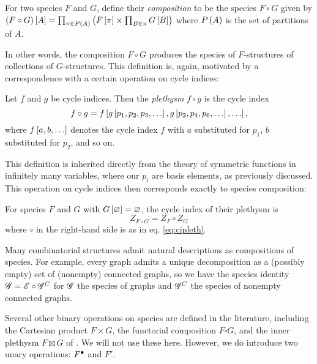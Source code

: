 \documentclass[sectionflow,singlespace,twoside,boldmathhdr]{brandiss} %
\numberwithin{section}{chapter}
\numberwithin{figure}{chapter}
\begin{document}
\begin{definition}
  \label{def:speccomp}
  For two species $F$ and $G$, define their \emph{composition} to be the species $F \circ G$ given by $\left( {F \circ G} \right) \left[ {A} \right] = \prod_{\pi \in P \left( {A} \right)} \left( {F \left[ {\pi} \right] \times \prod_{B \in \pi} G \left[ {B} \right]} \right)$ where $P \left( {A} \right)$ is the set of partitions of $A$.
\end{definition}
In other words, the composition $F \circ G$ produces the species of $F$-structures of collections of $G$-structures. This definition is, again, motivated by a correspondence with a certain operation on cycle indices:
\begin{definition}
  \label{def:cipleth}
  Let $f$ and $g$ be cycle indices. Then the \emph{plethysm} $f \circ g$ is the cycle index
  \begin{equation}
    \label{eq:cipleth}
    f \circ g = f \left[ {g \left[ {p_{1}, p_{2}, p_{3}, \dots} \right], g \left[ {p_{2}, p_{4}, p_{6}, \dots} \right], \dots} \right],
  \end{equation}
  where $f \left[ {a, b, \dots} \right]$ denotes the cycle index $f$ with $a$ substituted for $p_{1}$, $b$ substituted for $p_{2}$, and so on.
\end{definition}
This definition is inherited directly from the theory of symmetric functions in infinitely many variables, where our $p_{i}$ are basis elements, as previously discussed. This operation on cycle indices then corresponds exactly to species composition:
\begin{theorem}
  \label{thm:speccompci}
  For species $F$ and $G$ with $G \left[ {\varnothing} \right] = \varnothing$, the cycle index of their plethysm is
  \begin{equation}
    \label{eq:speccompci}
    Z_{F \circ G} = Z_{F} \circ Z_{G}
  \end{equation}
  where $\circ$ in the right-hand side is as in eq. \eqref{eq:cipleth}.
\end{theorem}
Many combinatorial structures admit natural descriptions as compositions of species.
For example, every graph admits a unique decomposition as a (possibly empty) set of (nonempty) connected graphs, so we have the species identity $\mathscr{G} = \mathscr{E} \circ \mathscr{G}^{C}$ for $\mathscr{G}$ the species of graphs and $\mathscr{G}^{C}$ the species of nonempty connected graphs.

Several other binary operations on species are defined in the literature, including the Cartesian product $F \times G$, the functorial composition $F \square G$, and the inner plethysm $F \boxtimes G$ of \cite{travis:inpleth}.
We will not use these here.
However, we do introduce two unary operations: ${F}^{\bullet }$ and $F'$.
\end{document}

